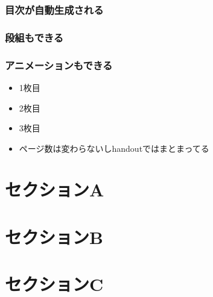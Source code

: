 \documentclass[dvipdfmx, handout]{beamer}
\begin{document}
\frame[plain]{\maketitle}

\begin{frame}{}
  \frametitle{目次が自動生成される}
  \tableofcontents
\end{frame}

\begin{frame}{}
  \frametitle{段組もできる}
    \begin{multicols}{2}
      \tableofcontents[sections={1-2}]
      \columnbreak
      \tableofcontents[sections={3}]
    \end{multicols}
\end{frame}

\begin{frame}{}
  \frametitle{アニメーションもできる}
  \begin{itemize}
    \item 1枚目
    \item 2枚目
    \item 3枚目
    \item ページ数は変わらないしhandoutではまとまってる
  \end{itemize}
\end{frame}

\section{セクションA}

\section{セクションB}

\section{セクションC}

\end{document}
